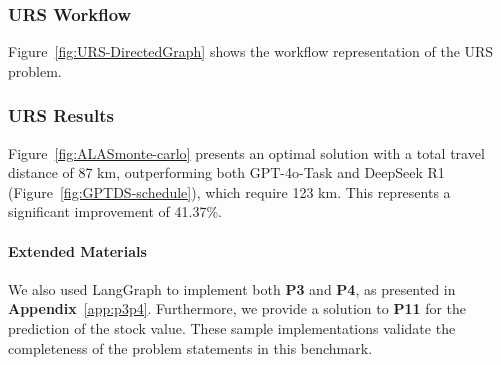\subsubsection{URS Workflow}

Figure~\ref{fig:URS-DirectedGraph} shows
the workflow representation of the URS problem.



\subsubsection{URS Results}

Figure~\ref{fig:ALASmonte-carlo} presents an optimal solution with a total travel distance of 87 km, outperforming both GPT-4o-Task and DeepSeek R1 (Figure~\ref{fig:GPTDS-schedule}), which require 123 km. This represents a significant improvement of 41.37\%.

\paragraph{Extended Materials}

We also used LangGraph to implement both \textbf{P3} and \textbf{P4}, as presented in \textbf{Appendix}~\ref{app:p3p4}. Furthermore, we provide a solution to \textbf{P11} for the prediction of the stock value. These sample implementations validate the completeness of the problem statements in this benchmark.



